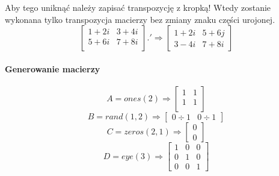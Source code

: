 \documentclass[16pt]{article}
\begin{document}
            Aby tego uniknąć należy zapisać transpozycję z kropką! Wtedy zostanie wykonana tylko transpozycja macierzy bez zmiany znaku części urojonej.
            \begin{equation*}
                \begin{bmatrix}
                    1+2i & 3+4i\\
                    5+6i & 7+8i\\
                \end{bmatrix}
                \textbf{$.'$}\Rightarrow
                \begin{bmatrix}
                    1+2i & 5+6j\\
                    3-4i & 7+8i
                \end{bmatrix}
            \end{equation*}

        \paragraph*{Generowanie macierzy}
            \begin{equation*}
                A= ones(2)
                \Rightarrow
                \begin{bmatrix}
                    1 & 1\\
                    1 & 1\\
                \end{bmatrix}
            \end{equation*}
            \begin{equation*}
                B= rand(1, 2)
                \Rightarrow
                \begin{bmatrix}
                    0\div 1 & 0\div 1
                \end{bmatrix}
            \end{equation*}
            \begin{equation*}
                C= zeros(2, 1)
                \Rightarrow
                \begin{bmatrix}
                    0 \\
                    0
                \end{bmatrix}
            \end{equation*}
            \begin{equation*}
                D= eye(3) \Rightarrow
                \begin{bmatrix}
                    1 & 0 & 0\\
                    0 & 1 & 0\\
                    0 & 0 & 1
                \end{bmatrix}
            \end{equation*}
    
\end{document}
